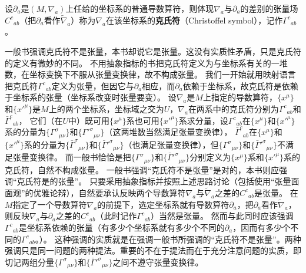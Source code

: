 \begin{definition}
设$\partial_a$是$(M, \nabla_a)$上任给的坐标系的普通导数算符，则体现$\nabla_a$与$\partial_a$的差别的张量场$C^c{}_{ab}$（把$\partial_a$看作$\tilde\nabla_a$）称为$\nabla_a$在该坐标系的\textbf{克氏符}（Christoffel symbol），记作$\Gamma^c{}_{ab}$。
\end{definition}

\begin{note}
一般书强调克氏符不是张量，本书却说它是张量。这没有实质性矛盾，只是克氏符的定义有微妙的不同。
不用抽象指标的书把克氏符定义为与坐标系有关的一堆数，在坐标变换下不服从张量变换律，故不构成张量。
我们一开始就用映射语言把克氏符$\Gamma^c{}_{ab}$定义为张量，但因它与$\partial_a$相应，而$\partial_a$依赖于坐标系，故克氏符是依赖于坐标系的张量（坐标系改变时张量要变）。
设$\nabla_a$是$M$上指定的导数算符，$\{x^\mu\}$和$\{x'^\mu\}$是$M$上的两个坐标系，坐标域之交为$U$，$\nabla_a$在两系中的克氏符分别为$\Gamma^c{}_{ab}$和$\bar\Gamma^c{}_{ab}$，
它们（在$U$中）既可用$\{x^\mu\}$系也可用$\{x'^\mu\}$系求分量，设$\Gamma^c{}_{ab}$在$\{x^\mu\}$和$\{x'^\mu\}$系的分量为$\{\Gamma^\sigma{}_{\mu\nu}\}$和$\{\Gamma'^\sigma{}_{\mu\nu}\}$（这两堆数当然满足张量变换律），
$\bar\Gamma^c{}_{ab}$在$\{x^\mu\}$和$\{x'^\mu\}$系的分量为$\{\bar\Gamma^\sigma{}_{\mu\nu}\}$和$\{\bar\Gamma'^\sigma{}_{\mu\nu}\}$（也满足张量变换律），但$\{\Gamma^\sigma{}_{\mu\nu}\}$和$\{\bar\Gamma'^\sigma{}_{\mu\nu}\}$不满足张量变换律。
而一般书恰恰是把$\{\Gamma^\sigma{}_{\mu\nu}\}$和$\{\bar\Gamma'^\sigma{}_{\mu\nu}\}$分别定义为$\{x^\mu\}$系和$\{x'^\mu\}$系的克氏符，自然不构成张量。
一般书强调``克氏符不是张量''是对的，本书则应强调``克氏符是的张量''。
只要采用抽象指标并按照上述思路讨论（包括使用``张量面面观''的优雅论辩），自然要承认反映两个导数算符$\nabla_a$与$\tilde\nabla_a$之差的$C^c{}_{ab}$是张量。
在$M$指定了一个导数算符$\nabla_a$的前提下，选定坐标系就有导数算符$\partial_a$，把$\partial_a$看作$\tilde\nabla_a$，则反映$\nabla_a$与$\partial_a$之差的$C^c{}_{ab}$（此时记作$\Gamma^c{}_{ab}$）当然是张量。
然而与此同时应该强调$\Gamma^c{}_{ab}$是坐标系依赖的张量（有多少个坐标系就有多少个不同的$\partial_a$，因而有多少个不同的$\Gamma^c{}_{ab}$。）。
这种强调的实质就是在强调一般书所强调的``克氏符不是张量''。两种强调只是同一问题的两种提法。重要的不在于提法而在于充分注意问题的实质，即切记两组分量$\{\Gamma^\sigma{}_{\mu\nu}\}$和$\{\bar\Gamma'^\sigma{}_{\mu\nu}\}$之间不遵守张量变换律。
\end{note}

